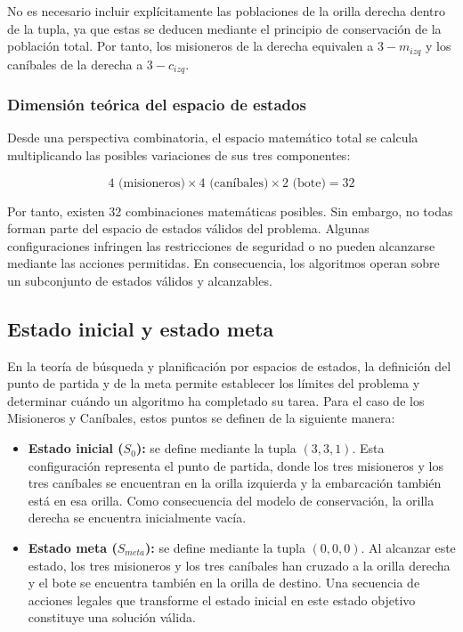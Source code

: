 \documentclass[
  spanish,
  11pt,
]{article}
\providecommand{\tightlist}{%
  \setlength{\itemsep}{0pt}\setlength{\parskip}{0pt}}
\begin{document}
No es necesario incluir explícitamente las poblaciones de la orilla
derecha dentro de la tupla, ya que estas se deducen mediante el
principio de conservación de la población total. Por tanto, los
misioneros de la derecha equivalen a \(3-m_{izq}\) y los caníbales de la
derecha a \(3-c_{izq}\).

\subsubsection{Dimensión teórica del espacio de
estados}\label{dimensiuxf3n-teuxf3rica-del-espacio-de-estados}

Desde una perspectiva combinatoria, el espacio matemático total se
calcula multiplicando las posibles variaciones de sus tres componentes:

\[
4\text{ (misioneros)} \times 4\text{ (caníbales)} \times 2\text{ (bote)} = 32
\]

Por tanto, existen 32 combinaciones matemáticas posibles. Sin embargo,
no todas forman parte del espacio de estados válidos del problema.
Algunas configuraciones infringen las restricciones de seguridad o no
pueden alcanzarse mediante las acciones permitidas. En consecuencia, los
algoritmos operan sobre un subconjunto de estados válidos y alcanzables.

\subsection{Estado inicial y estado
meta}\label{estado-inicial-y-estado-meta}

En la teoría de búsqueda y planificación por espacios de estados, la
definición del punto de partida y de la meta permite establecer los
límites del problema y determinar cuándo un algoritmo ha completado su
tarea. Para el caso de los Misioneros y Caníbales, estos puntos se
definen de la siguiente manera:

\begin{itemize}
\tightlist
\item
  \textbf{Estado inicial (\(S_0\)):} se define mediante la tupla
  \((3,3,1)\). Esta configuración representa el punto de partida, donde
  los tres misioneros y los tres caníbales se encuentran en la orilla
  izquierda y la embarcación también está en esa orilla. Como
  consecuencia del modelo de conservación, la orilla derecha se
  encuentra inicialmente vacía.
\item
  \textbf{Estado meta (\(S_{meta}\)):} se define mediante la tupla
  \((0,0,0)\). Al alcanzar este estado, los tres misioneros y los tres
  caníbales han cruzado a la orilla derecha y el bote se encuentra
  también en la orilla de destino. Una secuencia de acciones legales que
  transforme el estado inicial en este estado objetivo constituye una
  solución válida.
\end{itemize}
\end{document}
